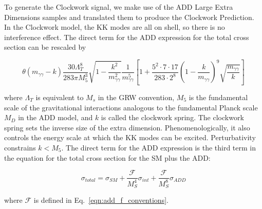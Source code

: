 To generate the Clockwork signal, we make use of the ADD Large Extra Dimensions samples and translated them to produce the Clockwork Prediction. In the Clockwork model, the KK modes are all on shell, so there is no interference effect. The direct term for the ADD expression for the total cross section can be rescaled by

\begin{equation}
\theta(m_{\gamma\gamma} - k ) \frac{30 \Lambda^{8}_{T}}{283 \pi M_{5}^{3} } \sqrt{1-\frac{k^2}{m^{2}_{\gamma\gamma}}} \frac{1}{m^5_{\gamma\gamma}} \left[ 1+ \frac{5^2\cdot 7 \cdot 17}{283\cdot 2^8} \left(1-\frac{k}{m_{\gamma\gamma}}\right)^9 \sqrt{\frac{m_{\gamma\gamma}}{k}} \right]
\label{eq:rescalingfactorCW}
\end{equation}

where $\Lambda_{T}$ is equivalent to $M_{s}$ in the GRW convention, $M_{5}$ is the fundamental scale of the gravitational interactions analogous to the fundamental Planck scale $M_{D}$ in the ADD model, and $k$ is called the clockwork spring. The clockwork spring sets the inverse size of the extra dimension. Phenomenologically, it also controls the energy scale at which the KK modes can be excited. Perturbativity constrains $k <M_{5}$. The direct term for the ADD expression is the third term in the equation for the total cross section for the SM plus the ADD:

\begin{equation}
\sigma_{total} = \sigma_{SM} + \frac{\mathcal{F}}{M^4_{S}} \sigma_{int}+\frac{\mathcal{F}}{M^8_{S}} \sigma_{ADD} 
\label{eq:totalADDxsec}
\end{equation}

where $\mathcal{F}$ is defined in Eq.~\ref{eqn:add_f_conventions}.



